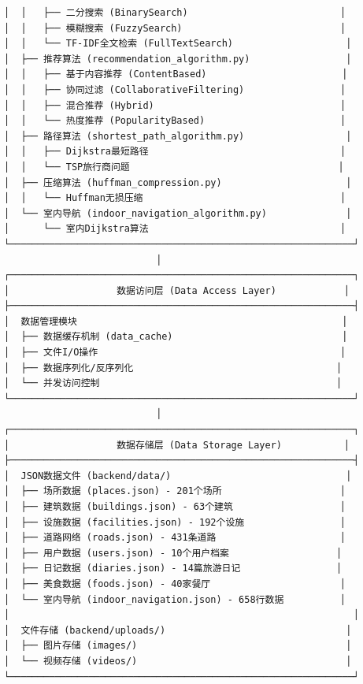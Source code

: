 \documentclass[12pt,a4paper]{article}
\begin{document}
\begin{verbatim}
│  │   ├── 二分搜索 (BinarySearch)                           │
│  │   ├── 模糊搜索 (FuzzySearch)                            │
│  │   └── TF-IDF全文检索 (FullTextSearch)                    │
│  ├── 推荐算法 (recommendation_algorithm.py)                 │
│  │   ├── 基于内容推荐 (ContentBased)                        │
│  │   ├── 协同过滤 (CollaborativeFiltering)                 │
│  │   ├── 混合推荐 (Hybrid)                                 │
│  │   └── 热度推荐 (PopularityBased)                        │
│  ├── 路径算法 (shortest_path_algorithm.py)                  │
│  │   ├── Dijkstra最短路径                                  │
│  │   └── TSP旅行商问题                                     │
│  ├── 压缩算法 (huffman_compression.py)                      │
│  │   └── Huffman无损压缩                                   │
│  └── 室内导航 (indoor_navigation_algorithm.py)              │
│      └── 室内Dijkstra算法                                  │
└─────────────────────────────────────────────────────────────┘
                           │
┌─────────────────────────────────────────────────────────────┐
│                   数据访问层 (Data Access Layer)            │
├─────────────────────────────────────────────────────────────┤
│  数据管理模块                                               │
│  ├── 数据缓存机制 (data_cache)                              │
│  ├── 文件I/O操作                                           │
│  ├── 数据序列化/反序列化                                    │
│  └── 并发访问控制                                          │
└─────────────────────────────────────────────────────────────┘
                           │
┌─────────────────────────────────────────────────────────────┐
│                   数据存储层 (Data Storage Layer)           │
├─────────────────────────────────────────────────────────────┤
│  JSON数据文件 (backend/data/)                               │
│  ├── 场所数据 (places.json) - 201个场所                     │
│  ├── 建筑数据 (buildings.json) - 63个建筑                   │
│  ├── 设施数据 (facilities.json) - 192个设施                 │
│  ├── 道路网络 (roads.json) - 431条道路                      │
│  ├── 用户数据 (users.json) - 10个用户档案                   │
│  ├── 日记数据 (diaries.json) - 14篇旅游日记                 │
│  ├── 美食数据 (foods.json) - 40家餐厅                       │
│  └── 室内导航 (indoor_navigation.json) - 658行数据          │
│                                                             │
│  文件存储 (backend/uploads/)                                │
│  ├── 图片存储 (images/)                                     │
│  └── 视频存储 (videos/)                                     │
└─────────────────────────────────────────────────────────────┘
\end{verbatim}
\end{document}
